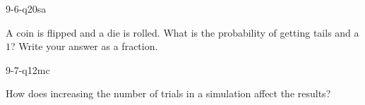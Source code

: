 \begin{practiceQuestion}{9-6-q20}{sa}
\begin{questionText}
A coin is flipped and a die is rolled. What is the probability of getting tails and a $1$? Write your answer as a fraction.
\end{questionText}
\end{practiceQuestion}

\begin{practiceQuestion}{9-7-q12}{mc}
\begin{questionText}
How does increasing the number of trials in a simulation affect the results?
\end{questionText}
\end{practiceQuestion}
